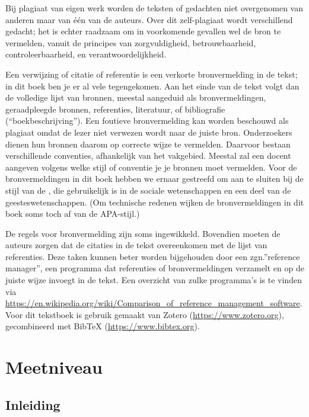 \documentclass[
]{book}
\begin{document}
Bij plagiaat van eigen werk worden de teksten of gedachten niet
overgenomen van anderen maar van één van de auteurs. Over dit
zelf-plagiaat wordt verschillend gedacht; het is echter raadzaam om in
voorkomende gevallen wel de bron te vermelden, vanuit de principes van
zorgvuldigheid, betrouwbaarheid, controleerbaarheid, en
verantwoordelijkheid.

Een verwijzing of citatie of referentie is een verkorte bronvermelding
in de tekst; in dit boek ben je er al vele tegengekomen. Aan het
einde van de tekst volgt dan de volledige
lijst van bronnen, meestal aangeduid als bronvermeldingen, geraadpleegde
bronnen, referenties, literatuur, of bibliografie (``boekbeschrijving'').
Een foutieve bronvermelding kan worden beschouwd als plagiaat \citep{UBVU15}
omdat de lezer niet verwezen wordt naar de juiste bron. Onderzoekers
dienen hun bronnen daarom op correcte wijze te vermelden. Daarvoor
bestaan verschillende conventies, afhankelijk van het vakgebied. Meestal
zal een docent aangeven volgens welke stijl of conventie je je bronnen
moet vermelden. Voor de bronvermeldingen in dit boek hebben we ernaar gestreefd om aan te sluiten bij de stijl van de \citet{APA10}, die
gebruikelijk is in de sociale wetenschappen en een deel van de
geesteswetenschappen.
(Om technische redenen wijken de bronvermeldingen in dit boek soms toch af van de APA-stijl.)

De regels voor bronvermelding zijn soms ingewikkeld. Bovendien moeten de
auteurs zorgen dat de citaties in de tekst overeenkomen met de lijst van
referenties. Deze taken kunnen beter worden bijgehouden door een
zgn.''reference manager'', een programma dat referenties of
bronvermeldingen verzamelt en op de juiste wijze invoegt in de tekst.
Een overzicht van zulke programma's is te vinden via
\url{https://en.wikipedia.org/wiki/Comparison_of_reference_management_software}.
Voor dit tekstboek is gebruik gemaakt van Zotero (\url{https://www.zotero.org}),
gecombineerd met BibTeX (\url{https://www.bibtex.org}).

\chapter{Meetniveau}\label{ch-meetniveau}

\section{Inleiding}\label{inleiding-1}
\end{document}
